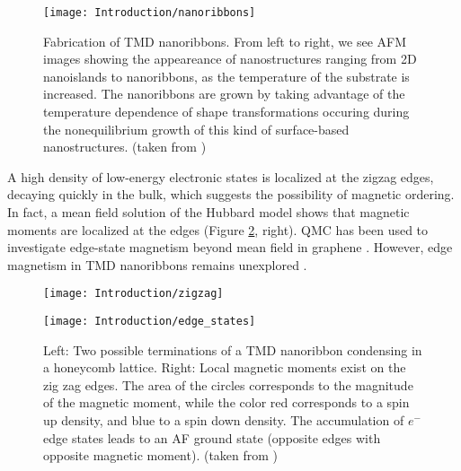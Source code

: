 \begin{figure}[H]
\centering
\texttt{[image: Introduction/nanoribbons]}
\caption[Fabrication of \ac{TMD} nanoribbons]{Fabrication of \ac{TMD} nanoribbons. From left to right, we see \ac{AFM} images showing the appeareance of nanostructures ranging from \ac{2D} nanoislands to nanoribbons, as the temperature of the substrate is increased. The nanoribbons are grown by taking advantage of the temperature dependence of shape transformations occuring during the nonequilibrium growth of this kind of surface-based nanostructures. (taken from \cite{chen_fabrication_2017})}
\label{fig:fabrication}
\end{figure}
   
A high density of low-energy electronic states is localized at the zigzag edges, decaying quickly in the bulk, which suggests the possibility of magnetic ordering.
In fact, a mean field solution of the Hubbard model shows that magnetic moments are localized at the edges \cite{yazyev_emergence_2010} (Figure \ref{fig:nanoribbons}, right).
QMC has been used to investigate edge-state magnetism beyond mean field in graphene \cite{feldner_dynamical_2011, golor_quantum_2013, cheng_strain-induced_2015, raczkowski_interplay_2017, yang_strain-tuning_2017}.
However, edge magnetism in TMD nanoribbons remains unexplored \cite{davelou_nanoribbon_2017}.
 
\begin{figure}[H]
\hspace{2cm}
\begin{minipage}[c]{0.1\textwidth}
\texttt{[image: Introduction/zigzag]}
\end{minipage} \hspace{6cm}
\begin{minipage}[c]{0.1\textwidth}
\texttt{[image: Introduction/edge\_states]}
\end{minipage}
 \caption[Zigzag edges of a nanoribbon and magnetism.]{Left: Two possible terminations of a \ac{TMD} nanoribbon condensing in a honeycomb lattice. Right: Local magnetic moments exist on the zig zag edges. The area of the circles corresponds to the magnitude of the magnetic moment, while the color red corresponds to a spin up density, and blue to a spin down density. The accumulation of $e^-$ edge states leads to an \ac{AF} ground state (opposite edges with opposite magnetic moment). (taken from \cite{yazyev_emergence_2010}) \label{fig:nanoribbons}}
\end{figure}

